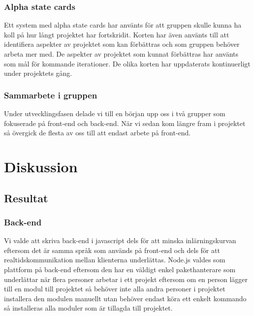 \documentclass{article}
\begin{document}
\subsubsection{Alpha state cards}
Ett system med alpha state cards har använts för att gruppen skulle kunna ha koll på hur långt projektet har fortskridit. Korten har även använts till att identifiera aspekter av projektet som kan förbättras och som gruppen behöver arbeta mer med. De aspekter av projektet som kunnat förbättras har använts som mål för kommande iterationer. De olika korten har uppdaterats kontinuerligt under projektets gång.

\subsubsection{Sammarbete i gruppen}
Under utvecklingsfasen delade vi till en början upp oss i två grupper som fokuserade på front-end och back-end. När vi sedan kom längre fram i projektet så övergick de flesta av oss till att endast arbete på front-end.


\clearpage

\clearpage

\section{Diskussion}

\subsection{Resultat}

\subsubsection{Back-end}
Vi valde att skriva back-end i javascript dels för att minska inlärningskurvan eftersom det är samma språk som används på front-end och dels för att realtidskommunikation mellan klienterna underlättas. Node.js valdes som plattform på back-end eftersom den har en väldigt enkel pakethanterare som underlättar när flera personer arbetar i ett projekt eftersom om en person lägger till en modul till projektet så behöver inte alla andra personer i projektet installera den modulen manuellt utan behöver endast köra ett enkelt kommando så installeras alla moduler som är tillagda till projektet.
\end{document}
